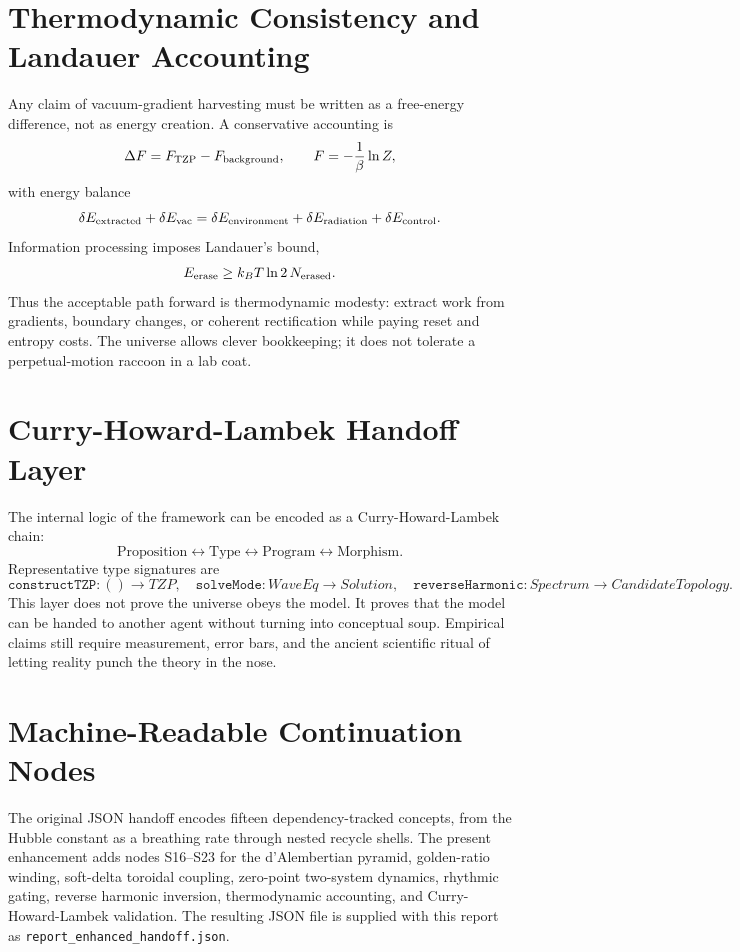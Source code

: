 \documentclass[12pt,a4paper]{article}
\begin{document}
\section{Thermodynamic Consistency and Landauer Accounting}
\label{sec:thermo-consistency}
Any claim of vacuum-gradient harvesting must be written as a free-energy difference, not as energy creation.  A conservative accounting is
\[
\Delta F = F_{\rm TZP}-F_{\rm background},\qquad
F=-\frac{1}{\beta}\ln Z,
\]
with energy balance
\[
\delta E_{\rm extracted}+\delta E_{\rm vac}
=\delta E_{\rm environment}+\delta E_{\rm radiation}+\delta E_{\rm control}.
\]
Information processing imposes Landauer's bound,
\[
E_{\rm erase}\ge k_B T\ln2\,N_{\rm erased}.
\]
Thus the acceptable path forward is thermodynamic modesty: extract work from gradients, boundary changes, or coherent rectification while paying reset and entropy costs.  The universe allows clever bookkeeping; it does not tolerate a perpetual-motion raccoon in a lab coat.

\section{Curry-Howard-Lambek Handoff Layer}
\label{sec:chl-layer}
The internal logic of the framework can be encoded as a Curry-Howard-Lambek chain:
\[
\text{Proposition}\leftrightarrow\text{Type}\leftrightarrow\text{Program}\leftrightarrow\text{Morphism}.
\]
Representative type signatures are
\[
\texttt{constructTZP}:()\rightarrow TZP,
\quad
\texttt{solveMode}:WaveEq\rightarrow Solution,
\quad
\texttt{reverseHarmonic}:Spectrum\rightarrow CandidateTopology.
\]
This layer does not prove the universe obeys the model.  It proves that the model can be handed to another agent without turning into conceptual soup.  Empirical claims still require measurement, error bars, and the ancient scientific ritual of letting reality punch the theory in the nose.

\section{Machine-Readable Continuation Nodes}
\label{sec:machine-nodes}
The original JSON handoff encodes fifteen dependency-tracked concepts, from the Hubble constant as a breathing rate through nested recycle shells.  The present enhancement adds nodes S16--S23 for the d'Alembertian pyramid, golden-ratio winding, soft-delta toroidal coupling, zero-point two-system dynamics, rhythmic gating, reverse harmonic inversion, thermodynamic accounting, and Curry-Howard-Lambek validation.  The resulting JSON file is supplied with this report as \texttt{report\_enhanced\_handoff.json}.
\end{document}

